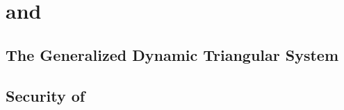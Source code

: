 \section{\Arion{} and \ArionHash{}}\label{sec:gtds}
\subsection{The Generalized Dynamic Triangular System}
\subsection{Security of \Arion{}}
